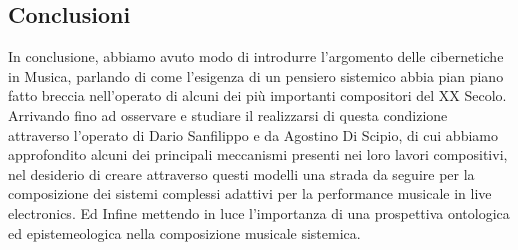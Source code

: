 \subsection{Conclusioni}
\label{Conclusioni}

In conclusione, 
abbiamo avuto modo di introdurre l'argomento delle cibernetiche in Musica,
parlando di come l'esigenza di un pensiero sistemico 
abbia pian piano fatto breccia nell'operato
di alcuni dei più importanti compositori del XX Secolo. 
Arrivando fino ad osservare e studiare il realizzarsi di questa condizione
attraverso l'operato di Dario Sanfilippo e da Agostino Di Scipio, 
di cui abbiamo approfondito alcuni dei principali meccanismi presenti nei loro lavori compositivi,
nel desiderio di creare attraverso questi modelli
una strada da seguire per la composizione dei sistemi complessi adattivi per la
performance musicale in live electronics.
Ed Infine mettendo in luce l'importanza di una prospettiva 
ontologica ed epistemeologica nella composizione musicale sistemica.